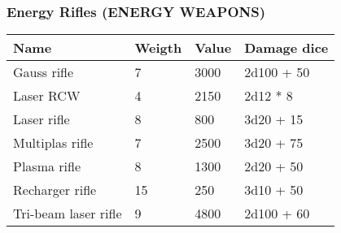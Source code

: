 
\subsubsection{Energy Rifles (ENERGY WEAPONS)}
\begin{longtable}{|p{4cm}|p{1.5cm}|p{1.5cm}|p{9cm}|}
\hline
\bfseries Name & \bfseries Weigth & \bfseries Value & \bfseries Damage dice \\
\hline
\endhead
Gauss rifle  & 7 & 3000 & 2d100 + 50 \\
Laser RCW  & 4 & 2150 & 2d12 * 8 \\
Laser rifle  & 8 & 800 & 3d20 + 15 \\
Multiplas rifle  & 7 & 2500 & 3d20 + 75 \\
Plasma rifle  & 8 & 1300 & 2d20 + 50 \\
Recharger rifle  & 15 & 250 & 3d10 + 50 \\
Tri-beam laser rifle & 9 & 4800 & 2d100 + 60 \\
\hline
\end{longtable}
